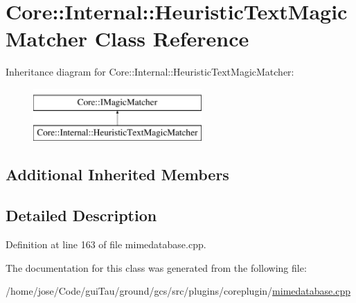 \hypertarget{class_core_1_1_internal_1_1_heuristic_text_magic_matcher}{\section{Core\-:\-:Internal\-:\-:Heuristic\-Text\-Magic\-Matcher Class Reference}
\label{class_core_1_1_internal_1_1_heuristic_text_magic_matcher}
}
Inheritance diagram for Core\-:\-:Internal\-:\-:Heuristic\-Text\-Magic\-Matcher\-:\begin{figure}[H]
\begin{center}
\leavevmode
\includegraphics[height=2.000000cm]{class_core_1_1_internal_1_1_heuristic_text_magic_matcher}
\end{center}
\end{figure}
\subsection*{Additional Inherited Members}


\subsection{Detailed Description}


Definition at line 163 of file mimedatabase.\-cpp.



The documentation for this class was generated from the following file\-:\begin{DoxyCompactItemize}
\item 
/home/jose/\-Code/gui\-Tau/ground/gcs/src/plugins/coreplugin/\hyperlink{mimedatabase_8cpp}{mimedatabase.\-cpp}\end{DoxyCompactItemize}
